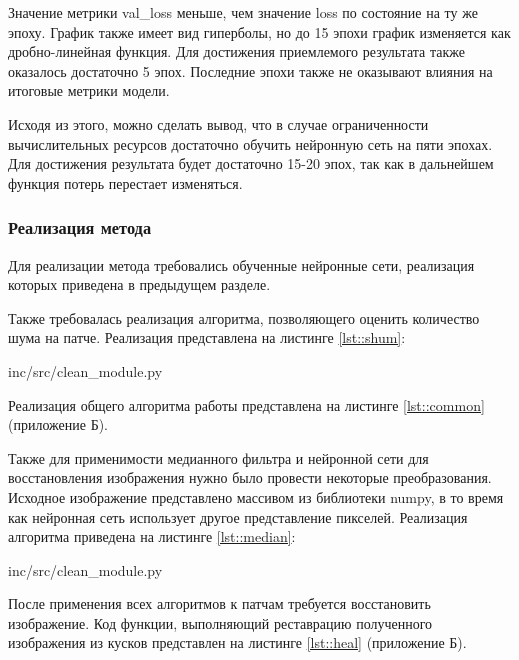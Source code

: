 Значение метрики val\_loss меньше, чем значение loss по состояние на ту же эпоху. 
График также имеет вид гиперболы, но до 15 эпохи график изменяется как дробно-линейная функция.
Для достижения приемлемого результата также оказалось достаточно 5 эпох. 
Последние эпохи также не оказывают влияния на итоговые метрики модели.

Исходя из этого, можно сделать вывод, что в случае ограниченности вычислительных ресурсов достаточно обучить нейронную сеть на пяти эпохах. 
Для достижения результата будет достаточно 15-20 эпох, так как в дальнейшем функция потерь перестает изменяться.

\subsubsection{Реализация метода}
Для реализации метода требовались обученные нейронные сети, реализация которых приведена в предыдущем разделе.

Также требовалась реализация алгоритма, позволяющего оценить количество шума на патче.
Реализация представлена на листинге \ref{lst::shum}:
\FloatBarrier
\begin{lstinputlisting}
	[language=Python, caption=Реализация алгоритма оценки количества шума, linerange = {62-70},
	basicstyle=\footnotesize\ttfamily, label={lst::shum}, frame=single, breaklines=true]{inc/src/clean\_module.py}
\end{lstinputlisting}
\FloatBarrier

Реализация общего алгоритма работы представлена на листинге \ref{lst::common} (приложение Б).

Также для применимости медианного фильтра и нейронной сети для восстановления изображения нужно было провести некоторые преобразования.
Исходное изображение представлено массивом из библиотеки numpy, в то время как нейронная сеть использует другое представление пикселей.
Реализация алгоритма приведена на листинге \ref{lst::median}:
\FloatBarrier
\begin{lstinputlisting}
	[language=Python, caption=Реализация медианного фильтра, linerange = {48-59},
	basicstyle=\footnotesize\ttfamily, label={lst::median}, frame=single, breaklines=true]{inc/src/clean\_module.py}
\end{lstinputlisting}
\FloatBarrier

После применения всех алгоритмов к патчам требуется восстановить изображение.
Код функции, выполняющий реставрацию полученного изображения из кусков представлен на листинге \ref{lst::heal} (приложение Б).

